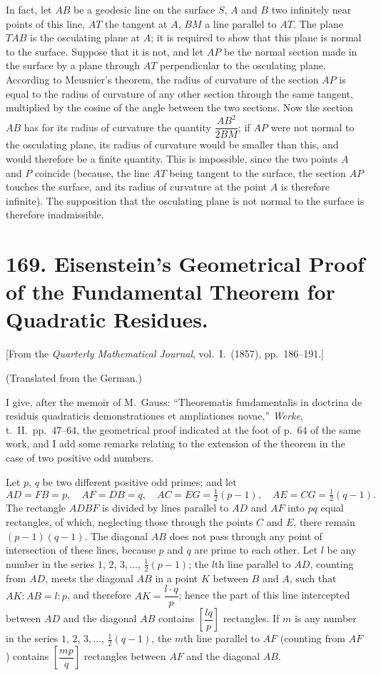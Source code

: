 \documentclass[11pt,a4paper]{book}
\begin{document}
In fact, let $AB$ be a geodesic line on the surface $S$, $A$ and $B$ two infinitely near points of this line, $AT$ the tangent at $A$, $BM$ a line parallel to $AT$. The plane $TAB$ is the osculating plane at $A$; it is required to show that this plane is normal to the surface. Suppose that it is not, and let $AP$ be the normal section made in the surface by a plane through $AT$ perpendicular to the osculating plane. According to Meusnier's theorem, the radius of curvature of the section $AP$ is equal to the radius of curvature of any other section through the same tangent, multiplied by the cosine of the angle between the two sections. Now the section $AB$ has for its radius of curvature the quantity $\dfrac{AB^2}{2BM}$; if $AP$ were not normal to the osculating plane, its radius of curvature would be smaller than this, and would therefore be a finite quantity. This is impossible, since the two points $A$ and $P$ coincide (because, the line $AT$ being tangent to the surface, the section $AP$ touches the surface, and its radius of curvature at the point $A$ is therefore infinite). The supposition that the osculating plane is not normal to the surface is therefore inadmissible.


\newpage
\section*{169. Eisenstein's Geometrical Proof of the Fundamental Theorem for Quadratic Residues.}

[From the \textit{Quarterly Mathematical Journal}, vol.~I.~(1857), pp.~186--191.]

(Translated from the German.)

I give, after the memoir of M.~Gauss: ``Theorematis fundamentalis in doctrina de residuis quadraticis demonstrationes et ampliationes novae,'' \textit{Werke}, t.~II.~pp.~47--64, the geometrical proof indicated at the foot of p.~64 of the same work, and I add some remarks relating to the extension of the theorem in the case of two positive odd numbers.

Let $p$, $q$ be two different positive odd primes; and let
\[
AD = FB = p,\quad AF = DB = q,\quad AC = EG = \tfrac{1}{2}(p-1),\quad AE = CG = \tfrac{1}{2}(q-1).
\]
The rectangle $ADBF$ is divided by lines parallel to $AD$ and $AF$ into $pq$ equal rectangles, of which, neglecting those through the points $C$ and $E$, there remain $(p-1)(q-1)$. The diagonal $AB$ does not pass through any point of intersection of these lines, because $p$ and $q$ are prime to each other. Let $l$ be any number in the series $1$, $2$, $3,\ldots$, $\frac{1}{2}(p-1)$; the $l$th line parallel to $AD$, counting from $AD$, meets the diagonal $AB$ in a point $K$ between $B$ and $A$, such that $AK:AB = l:p$, and therefore $AK = \dfrac{l \cdot q}{p}$; hence the part of this line intercepted between $AD$ and the diagonal $AB$ contains $\left[\dfrac{lq}{p}\right]$ rectangles. If $m$ is any number in the series $1$, $2$, $3,\ldots$, $\frac{1}{2}(q-1)$, the $m$th line parallel to $AF$ (counting from $AF$) contains $\left[\dfrac{mp}{q}\right]$ rectangles between $AF$ and the diagonal $AB$.
\end{document}
